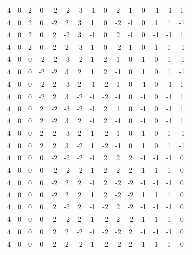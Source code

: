 \documentclass[aps,english,superscriptaddress,onecolumn,twoside,longbibliography,pra,floatfix,fleqn,nofootinbib]{revtex4-1}%
\theoremstyle{definition}
\begin{document}
{\begin{table}[hb]
{\begin{tabular}{c@{\hspace{1em}}ccc@{\hspace{1em}}ccc@{\hspace{1em}}c@{\hspace{1em}}ccc@{\hspace{1em}}ccc@{\hspace{1em}}c}
 4 & 0 & 2 & 0 & -2 & -2 & -3 & -1 & 0 & 2 & 1 & 0 & -1 & -1 & 1 \\
 4 & 0 & 2 & 0 & -2 & 2 & 3 & 1 & 0 & -2 & -1 & 0 & 1 & 1 & -1 \\
 4 & 0 & 2 & 0 & 2 & -2 & 3 & -1 & 0 & 2 & -1 & 0 & -1 & -1 & 1 \\
 4 & 0 & 2 & 0 & 2 & 2 & -3 & 1 & 0 & -2 & 1 & 0 & 1 & 1 & -1 \\
 4 & 0 & 0 & -2 & -2 & -3 & -2 & 1 & 2 & 1 & 0 & 1 & 0 & 1 & -1 \\
 4 & 0 & 0 & -2 & -2 & 3 & 2 & 1 & 2 & -1 & 0 & 1 & 0 & 1 & -1 \\
 4 & 0 & 0 & -2 & 2 & -3 & 2 & -1 & -2 & 1 & 0 & -1 & 0 & -1 & 1 \\
 4 & 0 & 0 & -2 & 2 & 3 & -2 & -1 & -2 & -1 & 0 & -1 & 0 & -1 & 1 \\
 4 & 0 & 0 & 2 & -2 & -3 & -2 & -1 & 2 & 1 & 0 & -1 & 0 & -1 & 1 \\
 4 & 0 & 0 & 2 & -2 & 3 & 2 & -1 & 2 & -1 & 0 & -1 & 0 & -1 & 1 \\
 4 & 0 & 0 & 2 & 2 & -3 & 2 & 1 & -2 & 1 & 0 & 1 & 0 & 1 & -1 \\
 4 & 0 & 0 & 2 & 2 & 3 & -2 & 1 & -2 & -1 & 0 & 1 & 0 & 1 & -1 \\
 4 & 0 & 0 & 0 & -2 & -2 & -2 & -1 & 2 & 2 & 2 & -1 & -1 & -1 & 0 \\
 4 & 0 & 0 & 0 & -2 & -2 & -2 & 1 & 2 & 2 & 2 & 1 & 1 & 1 & 0 \\
 4 & 0 & 0 & 0 & -2 & 2 & 2 & -1 & 2 & -2 & -2 & -1 & -1 & -1 & 0 \\
 4 & 0 & 0 & 0 & -2 & 2 & 2 & 1 & 2 & -2 & -2 & 1 & 1 & 1 & 0 \\
 4 & 0 & 0 & 0 & 2 & -2 & 2 & -1 & -2 & 2 & -2 & -1 & -1 & -1 & 0 \\
 4 & 0 & 0 & 0 & 2 & -2 & 2 & 1 & -2 & 2 & -2 & 1 & 1 & 1 & 0 \\
 4 & 0 & 0 & 0 & 2 & 2 & -2 & -1 & -2 & -2 & 2 & -1 & -1 & -1 & 0 \\
 4 & 0 & 0 & 0 & 2 & 2 & -2 & 1 & -2 & -2 & 2 & 1 & 1 & 1 & 0 \\
\end{tabular}}
\end{table}
}\vspace{-60ex}
\end{document}
